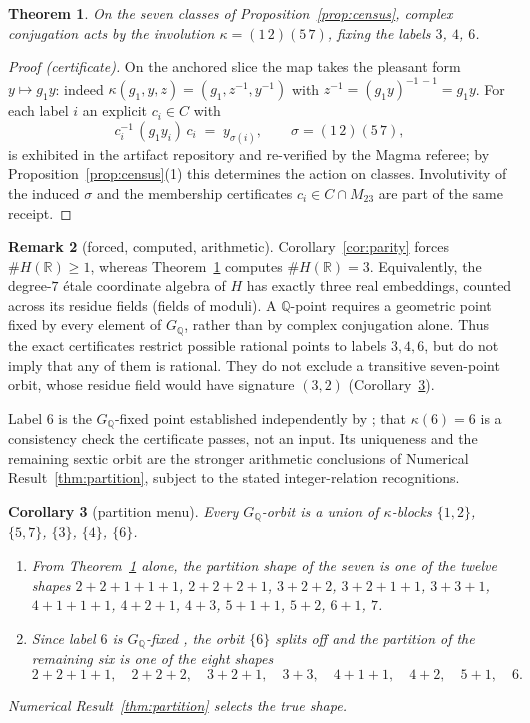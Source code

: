 \documentclass[11pt]{amsart}
\newcommand{\QQ}{\mathbb{Q}}
\newcommand{\GQ}{G_{\QQ}}
\newcommand{\Mtw}{M_{23}}
\newcommand{\kap}{\kappa}
\theoremstyle{plain}
\newtheorem{theorem}{Theorem}[section]
\newtheorem{corollary}[theorem]{Corollary}
\theoremstyle{definition}
\newtheorem{remark}[theorem]{Remark}
\begin{document}
\begin{theorem}\label{thm:kappa}
On the seven classes of Proposition~\ref{prop:census}, complex
conjugation acts by the involution
$\kap=(1\,2)(5\,7)$, fixing the labels $3$, $4$, $6$.
\end{theorem}

\begin{proof}[Proof (certificate)]
On the anchored slice the map takes the pleasant form
$y \mapsto g_1y$: indeed
$\kap(g_1,y,z)=(g_1,z^{-1},y^{-1})$ with
$z^{-1}=(g_1y)^{-1\,-1}=g_1y$. For each label $i$ an explicit
$c_i\in C$ with
\[
  c_i^{-1}\,(g_1 y_i)\,c_i \;=\; y_{\sigma(i)},\qquad
  \sigma=(1\,2)(5\,7),
\]
is exhibited in the artifact repository and re-verified by the Magma
referee; by Proposition~\ref{prop:census}(1) this determines the
action on classes. Involutivity of the induced $\sigma$ and the
membership certificates $c_i\in C\cap\Mtw$ are part of the same
receipt.
\end{proof}

\begin{remark}[forced, computed, arithmetic]
Corollary~\ref{cor:parity} forces $\#H(\mathbb{R})\ge1$, whereas
Theorem~\ref{thm:kappa} computes $\#H(\mathbb{R})=3$. Equivalently,
the degree-$7$ \'etale coordinate algebra of $H$ has exactly three
real embeddings, counted across its residue fields (fields of
moduli). A $\QQ$-point requires a geometric point fixed by every
element of $\GQ$, rather than by complex conjugation alone. Thus
the exact certificates restrict possible rational points to labels
$3,4,6$, but do not imply that any of them is rational. They do not
exclude a transitive seven-point orbit, whose residue field would
have signature $(3,2)$ (Corollary~\ref{cor:menu}).

Label $6$ is the $\GQ$-fixed point established independently by
\cite{HJLPPZ}; that $\kap(6)=6$ is a consistency check the
certificate passes, not an input. Its uniqueness and the remaining
sextic orbit are the stronger arithmetic conclusions of Numerical
Result~\ref{thm:partition}, subject to the stated integer-relation
recognitions.
\end{remark}

\begin{corollary}[partition menu]\label{cor:menu}
Every $\GQ$-orbit is a union of $\kap$-blocks
$\{1,2\}$, $\{5,7\}$, $\{3\}$, $\{4\}$, $\{6\}$.
\begin{enumerate}
\item From Theorem~\ref{thm:kappa} alone, the partition shape of the
  seven is one of the twelve shapes
  $2{+}2{+}1{+}1{+}1$, $2{+}2{+}2{+}1$, $3{+}2{+}2$,
  $3{+}2{+}1{+}1$, $3{+}3{+}1$, $4{+}1{+}1{+}1$, $4{+}2{+}1$,
  $4{+}3$, $5{+}1{+}1$, $5{+}2$, $6{+}1$, $7$.
\item Since label $6$ is $\GQ$-fixed \cite{HJLPPZ}, the orbit $\{6\}$
  splits off and the partition of the remaining six is one of the
  eight shapes
  \[
    2{+}2{+}1{+}1,\quad 2{+}2{+}2,\quad 3{+}2{+}1,\quad 3{+}3,\quad
    4{+}1{+}1,\quad 4{+}2,\quad 5{+}1,\quad 6 .
  \]
\end{enumerate}
Numerical Result~\ref{thm:partition} selects the true shape.
\end{corollary}
\end{document}

